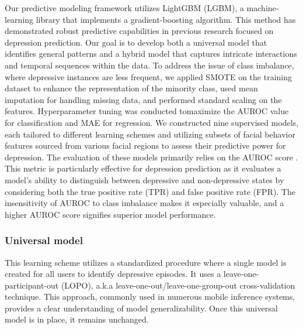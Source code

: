 Our predictive modeling framework utilizes LightGBM (LGBM), a machine-learning library that implements a gradient-boosting algorithm. This method has demonstrated robust predictive capabilities in previous research \cite{opoku2022mood, opoku2021predicting} focused on depression prediction. Our goal is to develop both a universal model that identifies general patterns and a hybrid model that captures intricate interactions and temporal sequences within the data. To address the issue of class imbalance, where depressive instances are less frequent, we applied SMOTE \cite{chawla2002smote} on the training dataset to enhance the representation of the minority class, used mean imputation for handling missing data, and performed standard scaling on the features. Hyperparameter tuning was conducted tomaximize the AUROC value for classification and MAE for regression. We constructed nine supervised models, each tailored to different learning schemes and utilizing subsets of facial behavior features sourced from various facial regions to assess their predictive power for depression. The evaluation of these models primarily relies on the AUROC score \cite{huang2005using}. This metric is particularly effective for depression prediction as it evaluates a model's ability to distinguish between depressive and non-depressive states by considering both the true positive rate (TPR) and false positive rate (FPR). The insensitivity of AUROC to class imbalance makes it especially valuable, and a higher AUROC score signifies superior model performance.

\subsubsection{Universal model}
This learning scheme utilizes a standardized procedure where a single model is created for all users to identify depressive episodes. It uses a leave-one-participant-out (LOPO), a.k.a leave-one-out/leave-one-group-out cross-validation technique. This approach, commonly used in numerous mobile inference systems, provides a clear understanding of model generalizability. Once this universal model is in place, it remains unchanged.


